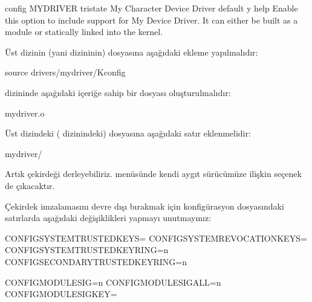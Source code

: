 \documentclass[a4paper,10pt,turkish]{sphinxmanual}
\begin{document}
\begin{sphinxVerbatim}[commandchars=\\\{\}]
config MYDRIVER
    tristate \PYGZdq{}My Character Device Driver\PYGZdq{}
    default y
    help
      Enable this option to include support for My Device Driver.
      It can either be built as a module or statically linked into the kernel.
\end{sphinxVerbatim}

\sphinxAtStartPar
{} Üst dizinin (yani  dizininin)  dosyasına aşağıdaki ekleme
yapılmalıdır:

\begin{sphinxVerbatim}[commandchars=\\\{\}]
source \PYGZdq{}drivers/mydriver/Kconfig\PYGZdq{}
\end{sphinxVerbatim}

\sphinxAtStartPar
{}  dizininde aşağıdaki içeriğe sahip bir  dosyası
oluşturulmalıdır:

\begin{sphinxVerbatim}[commandchars=\\\{\}]
my\PYGZus{}driver.o
\end{sphinxVerbatim}

\sphinxAtStartPar
{} Üst dizindeki ( dizinindeki)  dosyasına aşağıdaki satır
eklenmelidir:

\begin{sphinxVerbatim}[commandchars=\\\{\}]
mydriver/
\end{sphinxVerbatim}

\sphinxAtStartPar
Artık çekirdeği derleyebiliriz.  menüsünde kendi aygıt sürücümüze ilişkin seçenek
de çıkacaktır.

\sphinxAtStartPar
Çekirdek imzalamasını devre dışı bırakmak için konfigürasyon dosyasındaki satırlarda aşağıdaki
değişiklikleri yapmayı unutmayınız:

\begin{sphinxVerbatim}[commandchars=\\\{\}]
CONFIG\PYGZus{}SYSTEM\PYGZus{}TRUSTED\PYGZus{}KEYS=\PYGZdq{}\PYGZdq{}
CONFIG\PYGZus{}SYSTEM\PYGZus{}REVOCATION\PYGZus{}KEYS=\PYGZdq{}\PYGZdq{}
CONFIG\PYGZus{}SYSTEM\PYGZus{}TRUSTED\PYGZus{}KEYRING=n
CONFIG\PYGZus{}SECONDARY\PYGZus{}TRUSTED\PYGZus{}KEYRING=n

CONFIG\PYGZus{}MODULE\PYGZus{}SIG=n
CONFIG\PYGZus{}MODULE\PYGZus{}SIG\PYGZus{}ALL=n
CONFIG\PYGZus{}MODULE\PYGZus{}SIG\PYGZus{}KEY=\PYGZdq{}\PYGZdq{}
\end{sphinxVerbatim}
\end{document}
